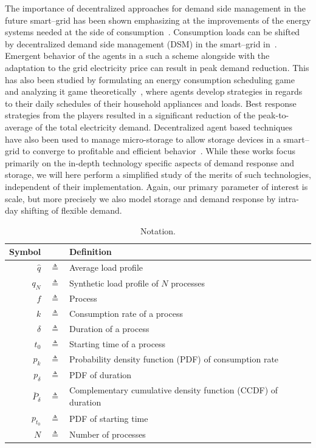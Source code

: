 \documentclass[conference]{IEEEtran}
\begin{document}
The importance of decentralized approaches for demand side management in the future smart--grid has been shown emphasizing at the improvements of the energy systems needed at the side of consumption~\cite{palensky2011demand}. Consumption loads can be shifted by decentralized demand side management (DSM) in the smart--grid in~\cite{Ramchurn2011a}. Emergent behavior of the agents in a such a scheme alongside with the adaptation to the grid electricity price can result in peak demand reduction.
This has also been studied by formulating an energy consumption scheduling game and analyzing it game theoretically~\cite{Mohsenian-Rad2010}, where agents develop strategies in regards to their daily schedules of their household appliances and loads. Best response strategies from the players resulted in a significant reduction of the peak-to-average of the total electricity demand. Decentralized agent based techniques have also been used to manage micro-storage to allow storage devices in a smart--grid to converge to profitable and efficient behavior~\cite{vytelingum2010agent}. %
While these works focus primarily on the in-depth technology specific aspects of demand response and storage, we will here perform a simplified study of the merits of such technologies, independent of their implementation. Again, our primary parameter of interest is scale, but more precisely we also model storage and demand response by intra-day shifting of flexible demand.

\begin{table}[t]
\small
\centering
\caption{Notation.}
\begin{tabular}{ r c p{} }
\toprule
 Symbol & & Definition \\
\midrule
  $\hat{q}$ & $\triangleq$ & Average load profile\\
  $q_N$ & $\triangleq$ & Synthetic load profile of $N$ processes\\
  $f$ & $\triangleq$ & Process\\
  $k$ & $\triangleq$ & Consumption rate of a process\\
  $\delta$ & $\triangleq$ & Duration of a process\\
  $t_0$ & $\triangleq$ & Starting time of a process\\
  $p_k$ & $\triangleq$ & Probability density function (PDF) of consumption rate\\
  $p_{\delta}$ & $\triangleq$ & PDF of duration\\
  $\bar{P}_{\delta}$ & $\triangleq$ & Complementary cumulative density function (CCDF) of duration\\
  $p_{t_0}$ & $\triangleq$ & PDF of starting time\\
  $N$ & $\triangleq$ & Number of processes\\
\bottomrule
\end{tabular}
\label{tab:notation}
\end{table}
\end{document}
